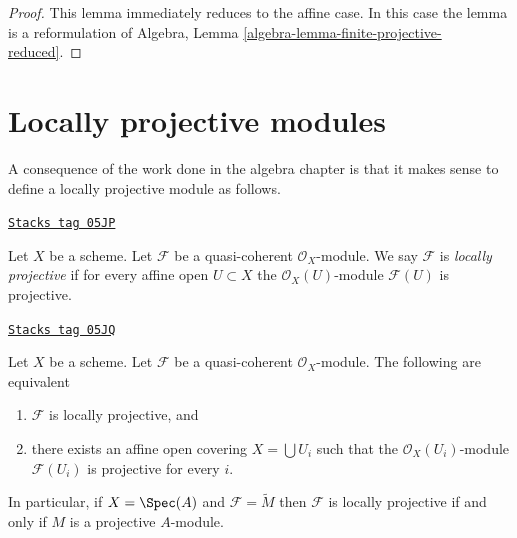 \begin{proof}
This lemma immediately reduces to the affine case.
In this case the lemma is a reformulation of
Algebra, Lemma \ref{algebra-lemma-finite-projective-reduced}.
\end{proof}

\section{Locally projective modules}
\label{properties-section-locally-projective}
A consequence of the work done in the algebra chapter is that it
makes sense to define a locally projective module as follows.

\begin{definition}
\label{properties-definition-locally-projective}
\href{https://stacks.math.columbia.edu/tag/05JP}{\texttt{Stacks tag 05JP}}

Let $X$ be a scheme. Let $\mathcal{F}$ be a quasi-coherent
$\mathcal{O}_X$-module. We say $\mathcal{F}$ is {\it locally projective}
if for every affine open $U \subset X$ the $\mathcal{O}_X(U)$-module
$\mathcal{F}(U)$ is projective.
\end{definition}

\begin{lemma}
\label{properties-lemma-locally-projective}
\href{https://stacks.math.columbia.edu/tag/05JQ}{\texttt{Stacks tag 05JQ}}

Let $X$ be a scheme.
Let $\mathcal{F}$ be a quasi-coherent $\mathcal{O}_X$-module.
The following are equivalent
\begin{enumerate}
\item $\mathcal{F}$ is locally projective, and
\item there exists an affine open covering $X = \bigcup U_i$
such that the $\mathcal{O}_X(U_i)$-module
$\mathcal{F}(U_i)$ is projective for every $i$.
\end{enumerate}
In particular, if $X = \Spec(A)$ and $\mathcal{F} = \widetilde{M}$
then $\mathcal{F}$ is locally projective if and only if $M$ is a projective
$A$-module.
\end{lemma}

